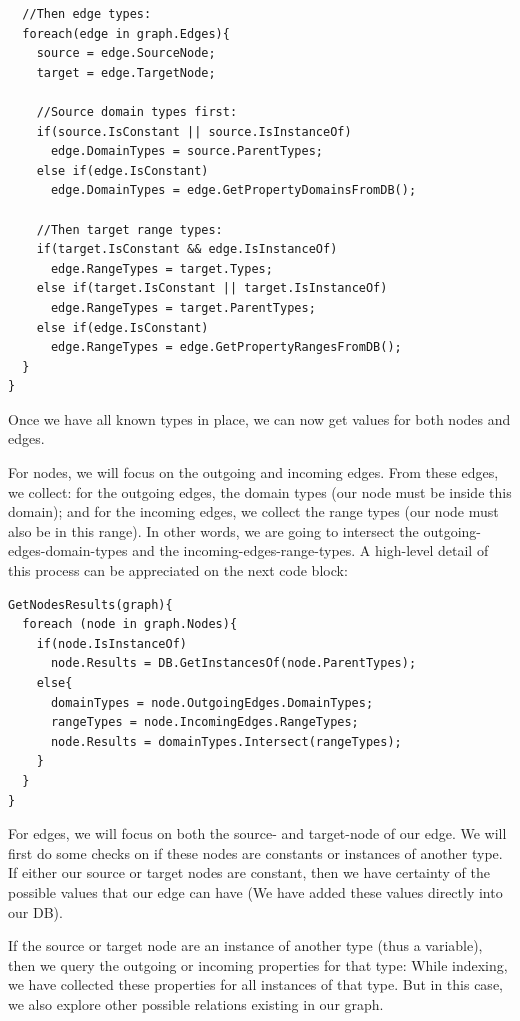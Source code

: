 \begin{example}
\begin{verbatim}
  //Then edge types:
  foreach(edge in graph.Edges){
    source = edge.SourceNode;
    target = edge.TargetNode;

    //Source domain types first:
    if(source.IsConstant || source.IsInstanceOf)
      edge.DomainTypes = source.ParentTypes;
    else if(edge.IsConstant)
      edge.DomainTypes = edge.GetPropertyDomainsFromDB();

    //Then target range types:
    if(target.IsConstant && edge.IsInstanceOf)
      edge.RangeTypes = target.Types;
    else if(target.IsConstant || target.IsInstanceOf)
      edge.RangeTypes = target.ParentTypes;
    else if(edge.IsConstant)
      edge.RangeTypes = edge.GetPropertyRangesFromDB();
  }
}
\end{verbatim}

Once we have all known types in place, we can now get values for both nodes and edges.

For nodes, we will focus on the outgoing and incoming edges. From these edges, we collect: for the outgoing edges, the domain types (our node must be inside this domain); and for the incoming edges, we collect the range types (our node must also be in this range). In other words, we are going to intersect the outgoing-edges-domain-types and the incoming-edges-range-types. A high-level detail of this process can be appreciated on the next code block:

\begin{verbatim}
GetNodesResults(graph){
  foreach (node in graph.Nodes){
    if(node.IsInstanceOf)
      node.Results = DB.GetInstancesOf(node.ParentTypes);
    else{
      domainTypes = node.OutgoingEdges.DomainTypes;
      rangeTypes = node.IncomingEdges.RangeTypes;
      node.Results = domainTypes.Intersect(rangeTypes);
    }
  }
}
\end{verbatim}

For edges, we will focus on both the source- and target-node of our edge. We will first do some checks on if these nodes are constants or instances of another type. If either our source or target nodes are constant, then we have certainty of the possible values that our edge can have (We have added these values directly into our DB).

If the source or target node are an instance of another type (thus a variable), then we query the outgoing or incoming properties for that type: While indexing, we have collected these properties for all instances of that type. But in this case, we also explore other possible relations existing in our graph.


\end{example}
